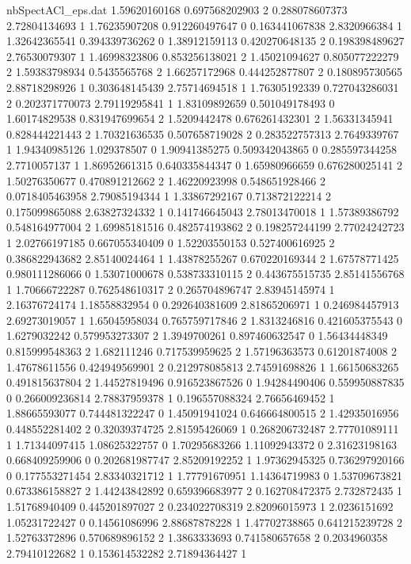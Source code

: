 \begin{filecontents}{nbSpectACl_eps.dat}
1.59620160168 0.697568202903 2
0.288078607373 2.72804134693 1
1.76235907208 0.912260497647 0
0.163441067838 2.8320966384 1
1.32642365541 0.394339736262 0
1.38912159113 0.420270648135 2
0.198398489627 2.76530079307 1
1.46998323806 0.853256138021 2
1.45021094627 0.805077222279 2
1.59383798934 0.5435565768 2
1.66257172968 0.444252877807 2
0.180895730565 2.88718298926 1
0.303648145439 2.75714694518 1
1.76305192339 0.727043286031 2
0.202371770073 2.79119295841 1
1.83109892659 0.501049178493 0
1.60174829538 0.831947699654 2
1.5209442478 0.676261432301 2
1.56331345941 0.828444221443 2
1.70321636535 0.507658719028 2
0.283522757313 2.7649339767 1
1.94340985126 1.029378507 0
1.90941385275 0.509342043865 0
0.285597344258 2.7710057137 1
1.86952661315 0.640335844347 0
1.65980966659 0.676280025141 2
1.50276350677 0.470891212662 2
1.46220923998 0.548651928466 2
0.0718405463958 2.79085194344 1
1.33867292167 0.713872122214 2
0.175099865088 2.63827324332 1
0.141746645043 2.78013470018 1
1.57389386792 0.548164977004 2
1.69985181516 0.482574193862 2
0.198257244199 2.77024242723 1
2.02766197185 0.667055340409 0
1.52203550153 0.527400616925 2
0.386822943682 2.85140024464 1
1.43878255267 0.670220169344 2
1.67578771425 0.980111286066 0
1.53071000678 0.538733310115 2
0.443675515735 2.85141556768 1
1.70666722287 0.762548610317 2
0.265704896747 2.83945145974 1
2.16376724174 1.18558832954 0
0.292640381609 2.81865206971 1
0.246984457913 2.69273019057 1
1.65045958034 0.765759717846 2
1.8313246816 0.421605375543 0
1.6279032242 0.579953273307 2
1.3949700261 0.897460632547 0
1.56434448349 0.815999548363 2
1.682111246 0.717539959625 2
1.57196363573 0.61201874008 2
1.47678611556 0.424949569901 2
0.212978085813 2.74591698826 1
1.66150683265 0.491815637804 2
1.44527819496 0.916523867526 0
1.94284490406 0.559950887835 0
0.266009236814 2.78837959378 1
0.196557088324 2.76656469452 1
1.88665593077 0.744481322247 0
1.45091941024 0.646664800515 2
1.42935016956 0.448552281402 2
0.32039374725 2.81595426069 1
0.268206732487 2.77701089111 1
1.71344097415 1.08625322757 0
1.70295683266 1.11092943372 0
2.31623198163 0.668409259906 0
0.202681987747 2.85209192252 1
1.97362945325 0.736297920166 0
0.177553271454 2.83340321712 1
1.77791670951 1.14364719983 0
1.53709673821 0.673386158827 2
1.44243842892 0.659396683977 2
0.162708472375 2.732872435 1
1.51768940409 0.445201897027 2
0.234022708319 2.82096015973 1
2.0236151692 1.05231722427 0
0.14561086996 2.88687878228 1
1.47702738865 0.641215239728 2
1.52763372896 0.570689896152 2
1.3863333693 0.741580657658 2
0.2034960358 2.79410122682 1
0.153614532282 2.71894364427 1

\end{filecontents}
